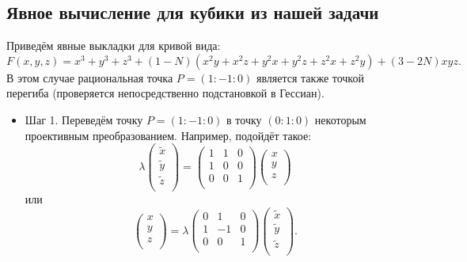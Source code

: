 \subsection*{Явное вычисление для кубики из нашей задачи}

\noindent Приведём явные выкладки для кривой вида:
\[
F(x, y, z) = x^3 + y^3 + z^3 + (1 - N) (x^2 y + x^2 z + y^2 x + y^2 z + z^2 x + z^2 y) +
(3 - 2 N) x y z 
.\] 
В этом случае рациональная точка \(P = (1 : -1 : 0)\) является также точкой перегиба
(проверяется непосредственно подстановкой в Гессиан).

\begin{itemize}[leftmargin=0.6cm]
    \item Шаг 1. Переведём точку \(P = (1 : -1 : 0)\) в точку
    \((0 : 1 : 0)\) некоторым проективным преобразованием. Например,
    подойдёт такое:
    \[
    \lambda
    \begin{pmatrix}
        \widetilde{x} \\
        \widetilde{y} \\
        \widetilde{z} \\
    \end{pmatrix} 
    = 
    \begin{pmatrix}
        1 & 1 & 0 \\
        1 & 0 & 0 \\
        0 & 0 & 1 \\
    \end{pmatrix}
    \begin{pmatrix}
        x \\
        y \\
        z \\
    \end{pmatrix}
    \]
    или
    \[
    \begin{pmatrix}
        x \\
        y \\
        z \\
    \end{pmatrix} =
    \lambda
    \begin{pmatrix}
        0 & 1 & 0 \\
        1 & -1 & 0 \\
        0 & 0 & 1 \\
    \end{pmatrix}
    \begin{pmatrix}
        \widetilde{x} \\
        \widetilde{y} \\
        \widetilde{z} \\
    \end{pmatrix} 
    .\] 
    


\end{itemize}
